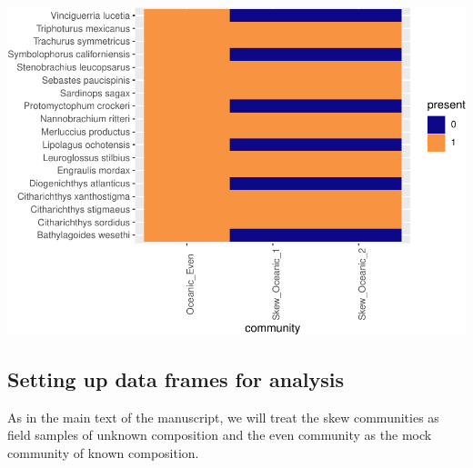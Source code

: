 \documentclass[
]{article}
\begin{document}
\includegraphics{Appendix-S4_files/figure-latex/which_sp-1.pdf}

\hypertarget{setting-up-data-frames-for-analysis}{%
\subsection{Setting up data frames for
analysis}\label{setting-up-data-frames-for-analysis}}

As in the main text of the manuscript, we will treat the skew
communities as field samples of unknown composition and the even
community as the mock community of known composition.
\end{document}
